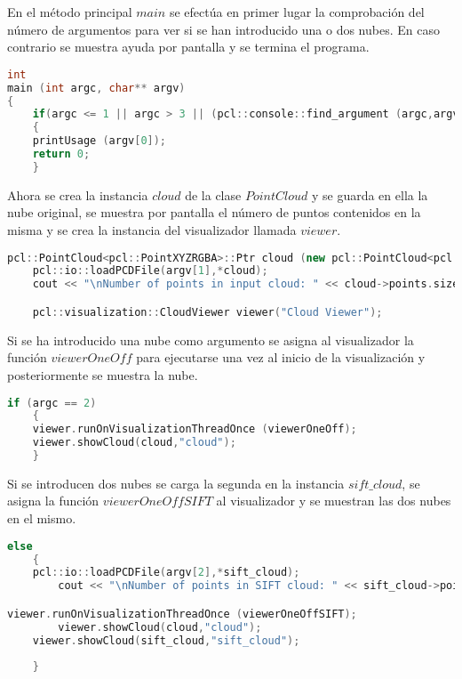 En el método principal $main$ se efectúa en primer lugar la comprobación del número de argumentos para ver si se han introducido una o dos nubes. En caso contrario se muestra ayuda por pantalla y se termina el programa.

\begin{lstlisting}[language=C++,breaklines]
int 
main (int argc, char** argv)
{   
    if(argc <= 1 || argc > 3 || (pcl::console::find_argument (argc,argv,"-h")) >= 0 )
    {
	printUsage (argv[0]);
	return 0;
    } 
\end{lstlisting}

Ahora se crea la instancia $cloud$ de la clase $PointCloud$ y se guarda en ella la nube original, se muestra por pantalla el número de puntos contenidos en la misma y se crea la instancia del visualizador llamada $viewer$.

\begin{lstlisting}[language=C++,breaklines]
pcl::PointCloud<pcl::PointXYZRGBA>::Ptr cloud (new pcl::PointCloud<pcl::PointXYZRGBA>); 
    pcl::io::loadPCDFile(argv[1],*cloud);
    cout << "\nNumber of points in input cloud: " << cloud->points.size() << "\n";

    pcl::visualization::CloudViewer viewer("Cloud Viewer");
\end{lstlisting}

Si se ha introducido una nube como argumento se asigna al visualizador la función $viewerOneOff$ para ejecutarse una vez al inicio de la visualización y posteriormente se muestra la nube.

\begin{lstlisting}[language=C++,breaklines]
if (argc == 2)
    {
	viewer.runOnVisualizationThreadOnce (viewerOneOff);
	viewer.showCloud(cloud,"cloud");
    }
\end{lstlisting}

Si se introducen dos nubes se carga la segunda en la instancia $sift\_cloud$, se asigna la función $viewerOneOffSIFT$ al visualizador y se muestran las dos nubes en el mismo.

\begin{lstlisting}[language=C++,breaklines]
else 
    {
	pcl::io::loadPCDFile(argv[2],*sift_cloud);
        cout << "\nNumber of points in SIFT cloud: " << sift_cloud->points.size() << "\n";

viewer.runOnVisualizationThreadOnce (viewerOneOffSIFT);
    	viewer.showCloud(cloud,"cloud");
   	viewer.showCloud(sift_cloud,"sift_cloud");
 
    }
\end{lstlisting}

